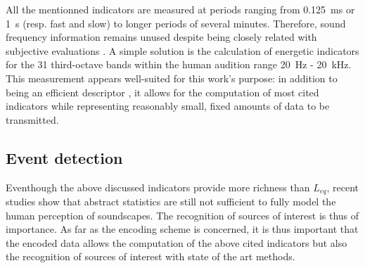 \documentclass[final,3p,times,twocolumn]{elsarticle}
\begin{document}
All the mentionned indicators are measured at periods ranging from 0.125~ms or 1~s (resp. fast and slow) to longer periods of several minutes. Therefore, sound frequency information remains unused despite being closely related with subjective evaluations \cite{ishiyama2000}. A simple solution is the calculation of energetic indicators for the 31 third-octave bands within the human audition range 20~Hz - 20~kHz.\\

This measurement appears well-suited for this work's purpose: in addition to being an efficient descriptor \cite{torija2013}, it allows for the computation of most cited indicators while representing reasonably small, fixed amounts of data to be transmitted.

\subsection{Event detection}

Eventhough the above discussed indicators provide more richness than $L_{eq}$, recent studies show that abstract statistics are still not sufficient to fully model the human perception of soundscapes. The recognition of sources of interest is thus of importance. As far as the encoding scheme is concerned, it is thus important that the encoded data allows the computation of the above cited indicators but also the recognition of sources of interest with state of the art methods.
\end{document}

